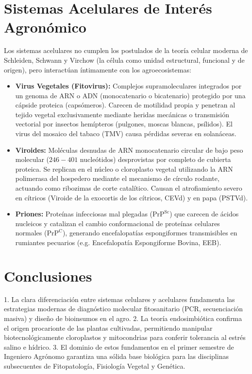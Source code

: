 \documentclass[12pt,spanish,letterpaper,oneside]{article}
\begin{document}
\section{Sistemas Acelulares de Interés Agronómico}
Los sistemas acelulares no cumplen los postulados de la teoría celular moderna de Schleiden, Schwann y Virchow (la célula como unidad estructural, funcional y de origen), pero interactúan íntimamente con los agroecosistemas:
\begin{itemize}
    \item \textbf{Virus Vegetales (Fitovirus):} Complejos supramoleculares integrados por un genoma de ARN o ADN (monocatenario o bicatenario) protegido por una cápside proteica (capsómeros). Carecen de motilidad propia y penetran al tejido vegetal exclusivamente mediante heridas mecánicas o transmisión vectorial por insectos hemípteros (pulgones, moscas blancas, psílidos). El virus del mosaico del tabaco (TMV) causa pérdidas severas en solanáceas.
    \item \textbf{Viroides:} Moléculas desnudas de ARN monocatenario circular de bajo peso molecular ($246-401$ nucleótidos) desprovistas por completo de cubierta proteica. Se replican en el núcleo o cloroplasto vegetal utilizando la ARN polimerasa del hospedero mediante el mecanismo de círculo rodante, actuando como ribozimas de corte catalítico. Causan el atrofiamiento severo en cítricos (Viroide de la exocortis de los cítricos, CEVd) y en papa (PSTVd).
    \item \textbf{Priones:} Proteínas infecciosas mal plegadas ($\text{PrP}^{\text{Sc}}$) que carecen de ácidos nucleicos y catalizan el cambio conformacional de proteínas celulares normales ($\text{PrP}^{\text{C}}$), generando encefalopatías espongiformes transmisibles en rumiantes pecuarios (e.g. Encefalopatía Espongiforme Bovina, EEB).
\end{itemize}

\section{Conclusiones}
1. La clara diferenciación entre sistemas celulares y acelulares fundamenta las estrategias modernas de diagnóstico molecular fitosanitario (PCR, secuenciación masiva) y diseño de bioinsumos en el agro.
2. La teoría endosimbiótica confirma el origen procarionte de las plantas cultivadas, permitiendo manipular biotecnológicamente cloroplastos y mitocondrias para conferir tolerancia al estrés salino e hídrico.
3. El dominio de estos fundamentos en el primer semestre de Ingeniero Agrónomo garantiza una sólida base biológica para las disciplinas subsecuentes de Fitopatología, Fisiología Vegetal y Genética.

\newpage
\printbibliography[title={Referencias bibliográficas}]
\end{document}
